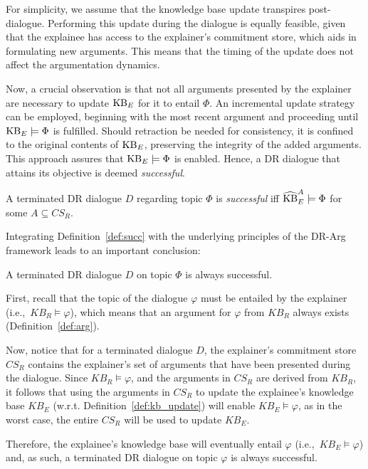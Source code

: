 \documentclass{article}
\begin{document}
For simplicity, we assume that the knowledge base update transpires post-dialogue. Performing this update during the dialogue is equally feasible, given that the explainee has access to the explainer's commitment store, which aids in formulating new arguments. This means that the timing of the update does not affect the argumentation dynamics.


Now, a crucial observation is that not all arguments presented by the explainer are necessary to update $\mathrm{KB}_E$ for it to entail $\Phi$. An incremental update strategy can be employed, beginning with the most recent argument and proceeding until $\mathrm{KB}_E \models \Phi$ is fulfilled. Should retraction be needed for consistency, it is confined to the original contents of $\mathrm{KB}_E$, preserving the integrity of the added arguments. This approach assures that $\mathrm{KB}_E \models \Phi$ is enabled. Hence, a DR dialogue that attains its objective is deemed \emph{successful}.

\begin{definition}
    A terminated DR dialogue $D$ regarding topic $\Phi$ is \emph{successful} iff $\widehat{\mathrm{KB}}_E^{A} \models \Phi$ for some $A \subseteq CS_R$.
    \label{def:succ}
\end{definition}

Integrating Definition~\ref{def:succ} with the underlying principles of the DR-Arg framework leads to an important conclusion:

\begin{theorem}
    A terminated DR dialogue $D$ on topic $\Phi$ is always successful.
    \label{succ_theo}
\end{theorem}

\begin{sproof}
First, recall that the topic of the dialogue $\varphi$ must be entailed by the explainer (i.e.,~$KB_R \models \varphi$), which means that an argument for $\varphi$ from $KB_R$ always exists (Definition~\ref{def:arg}).

Now, notice that for a terminated dialogue $D$, the explainer's commitment store $CS_R$ contains the explainer's set of arguments that have been presented during the dialogue. Since $KB_R \models \varphi$, and the arguments in $CS_R$ are derived from $KB_R$, it follows that using the arguments in $CS_R$ to update the explainee's knowledge base $KB_E$ (w.r.t. Definition~\ref{def:kb_update}) will enable $KB_E \models \varphi$, as in the worst case, the entire $CS_R$ will be used to update $KB_E$.

Therefore, the explainee's knowledge base will eventually entail $\varphi$ (i.e.,~$KB_E \models \varphi$) and, as such, a terminated DR dialogue on topic $\varphi$ is always successful.   
\end{sproof}
\end{document}
